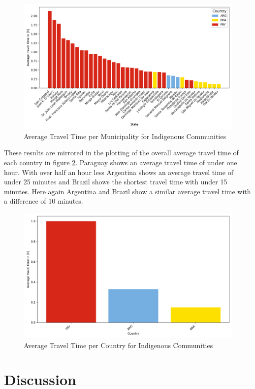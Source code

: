 \documentclass[11pt, a4paper]{report}
\begin{document}
\begin{figure}[H]
  \centering
  \includegraphics[width=0.9\linewidth]{figures/statesIC.png}
  \caption{Average Travel Time per Municipality for Indigenous Communities}
  \label{fig:traveltimeindigstatesplot}
\end{figure}
These results are mirrored in the plotting of the overall average travel time of each country in figure \ref{fig:traveltimeindigcountriesplot}. Paraguay shows an average travel time of under one hour. With over half an hour less Argentina shows an average travel time of under 25 minutes and Brazil shows the shortest travel time with under 15 minutes. Here again Argentina and Brazil show a similar average travel time with a difference of 10 minutes.
\begin{figure}[H]
  \centering
  \includegraphics[width=0.9\linewidth]{figures/countriesIC.png}
  \caption{Average Travel Time per Country for Indigenous Communities}
  \label{fig:traveltimeindigcountriesplot}
\end{figure}

\chapter{Discussion}
\end{document}

